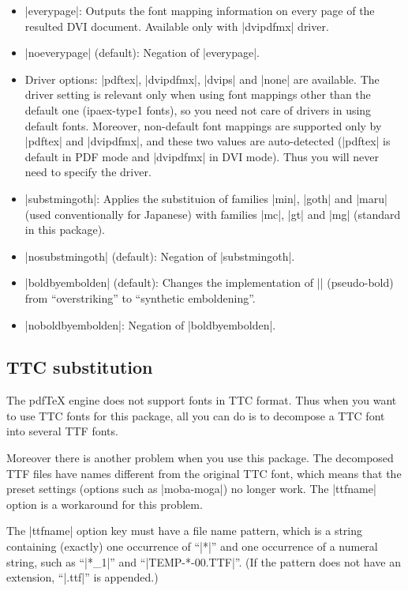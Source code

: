 \documentclass[a4paper]{article}
\newcommand{\Means}{:\hspace{1em plus 1em}}
\providecommand{\pdfTeX}{pdf\/\TeX}
\begin{document}
\begin{itemize}
\item |everypage|\Means
  Outputs the font mapping information on every page of the resulted
  DVI document.
  Available only with |dvipdfmx| driver.
\item |noeverypage| (default)\Means
  Negation of |everypage|.
\item Driver options\Means
  |pdftex|, |dvipdfmx|, |dvips| and |none| are available.
  The driver setting is relevant only when using font mappings other
  than the default one (ipaex-type1 fonts), so you need not care of
  drivers in using default fonts.
  Moreover, non-default font mappings are supported only by |pdftex|
  and |dvipdfmx|, and these two values are auto-detected
  (|pdftex| is default in PDF mode and |dvipdfmx| in DVI mode).
  Thus you will never need to specify the driver.
\item |substmingoth|\Means
  Applies the substituion of families |min|, |goth| and |maru|
  (used conventionally for Japanese) with families |mc|, |gt| and |mg|
  (standard in this package).
\item |nosubstmingoth| (default)\Means
  Negation of |substmingoth|.
\item |boldbyembolden| (default)\Means
  Changes the implementation of |\CJKbold| (pseudo-bold) from
  ``overstriking'' to ``synthetic emboldening''.
\item |noboldbyembolden|\Means
  Negation of |boldbyembolden|.
\end{itemize}

\subsection{TTC substitution}
\label{ssec:ttfname}

The {\pdfTeX} engine does not support fonts in TTC format.
Thus when you want to use TTC fonts for this package,
all you can do is to decompose a TTC font
into several TTF fonts.

Moreover there is another problem when you use this package.
The decomposed TTF files have names
different from the original TTC font,
which means that
the preset settings (options such as |moba-moga|) no longer work.
The |ttfname| option is a workaround for this problem.

The |ttfname| option key must have a file name pattern,
which is a string containing (exactly) one occurrence of ``|*|''
and one occurrence of a numeral string,
such as ``|*_1|'' and ``|TEMP-*-00.TTF|''.
(If the pattern does not have an extension, ``|.ttf|'' is appended.)
\end{document}
